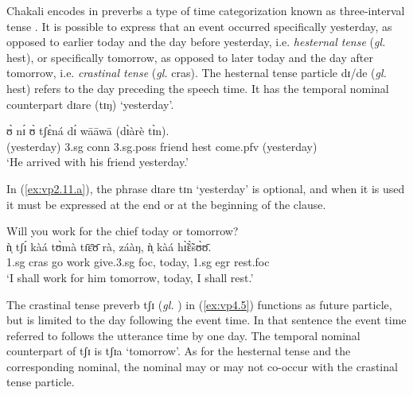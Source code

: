 \begin{exe}
\begin{exe}
\begin{exe}
{\begin{exe}
\begin{exe}
\begin{exe}
\begin{exe}
\begin{exe}
\begin{exe}
\begin{exe}
\begin{exe}
\begin{exe}
\begin{exe}
\begin{exe}
\begin{exe}
\begin{exe}
\begin{exe}
\begin{exe}
\begin{exe}
\begin{exe}
\begin{exe}
\begin{exe}
\begin{exe}
Chakali encodes  in  preverbs  a type of time categorization  known as 
three-interval tense  \citep[366]{Fraw92}. It is possible to express that an 
event occurred specifically yesterday, as opposed to earlier today and the day 
before yesterday, i.e. {\it hesternal tense} ({\it gl.} {\sc hest}), or 
specifically tomorrow, as opposed to later today and the day after tomorrow, 
i.e. {\it crastinal tense}  ({\it gl.}  {\sc cras}). The hesternal tense 
particle {\sls dɪ}/{\sls de} ({\it gl.} {\sc hest})  refers to the day 
preceding 
the speech time.  It has the temporal nominal  counterpart  {\sls dɪare (tɪŋ)} 
`yesterday'.  



\ea\label{ex:vp2.11.a} 
 ʊ̀ nɪ́ ʊ̀ tʃɛ̀ná dɪ́ wāāwā  {(dɪ̀àrè tɪ̀n)}.\\
{(yesterday)} {\sc 3.sg} {\sc conn} {\sc 3.sg.poss} friend
{\sc hest}  come.{\sc pfv} {(yesterday)}\\ 
\glt  `He arrived with his friend yesterday.'
 \z



In (\ref{ex:vp2.11.a}),  the  phrase {\sls dɪare 
tɪn} `yesterday' is optional,  and  when it is used it must be expressed at the 
end or at the beginning of the clause.


\ea\label{ex:vp4.5} {\rm Will you work for the chief today or tomorrow?}\\
\gll  ǹ̩ tʃɪ́ kàá tʊ̀mà tɪ̄ɛ̄ʊ̄ rà, záàŋ,  ǹ̩ kàá hɪ̃̀ɛ̃̀sʊ̀ʊ̄.\\
 {\sc 1.sg} {\sc cras}  go  work give.{\sc 3.sg} {\sc foc},
today,   {\sc 1.sg}  {\sc egr} rest.{\sc foc}\\
\glt  `I shall work for
him tomorrow, today,  I shall rest.' 
 \z

The crastinal tense preverb {\sls tʃɪ} ({\it gl.} {\cras})  in  (\ref{ex:vp4.5})
functions as future particle,  but is limited to the day following the event
time.
In that sentence the event time referred to follows  the utterance
time by one day.  The temporal nominal counterpart  of {\sls tʃɪ} is {\sls  
tʃɪa} 
`tomorrow'. As
for the hesternal tense and the corresponding nominal,  the  nominal may or
may not co-occur with the crastinal tense particle. 





\end{exe}
\end{exe}
\end{exe}
\end{exe}
\end{exe}
\end{exe}
\end{exe}
\end{exe}
\end{exe}
\end{exe}
\end{exe}
\end{exe}
\end{exe}
\end{exe}
\end{exe}
\end{exe}
\end{exe}
\end{exe}
\end{exe}
\end{exe}}
\end{exe}
\end{exe}
\end{exe}

